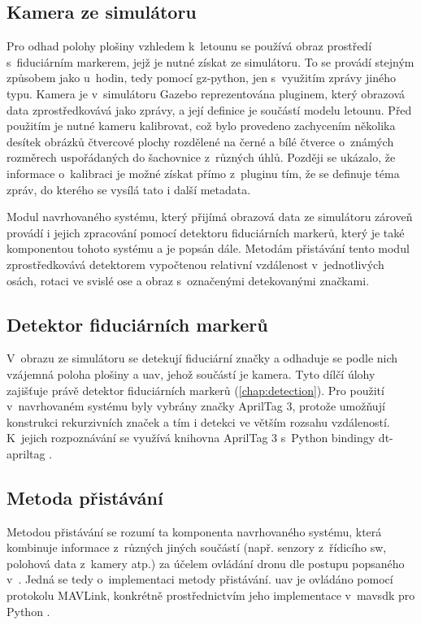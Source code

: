     \subsection{Kamera ze simulátoru}
      Pro odhad polohy plošiny vzhledem k~letounu se používá obraz prostředí s~fiduciárním markerem, jejž je nutné získat ze simulátoru. To se provádí stejným způsobem jako u~hodin, tedy pomocí gz-python, jen s~využitím zprávy jiného typu. Kamera je v~simulátoru Gazebo reprezentována pluginem, který obrazová data zprostředkovává jako zprávy, a její definice je součástí modelu letounu. Před použitím je nutné kameru kalibrovat, což bylo provedeno zachycením několika desítek obrázků čtvercové plochy rozdělené na černé a bílé čtverce o~známých rozměrech uspořádaných do šachovnice z~různých úhlů. Později se ukázalo, že informace o~kalibraci je možné získat přímo z~pluginu tím, že se definuje téma zpráv, do kterého se vysílá tato i další metadata.

      Modul navrhovaného systému, který přijímá obrazová data ze simulátoru zároveň provádí i jejich zpracování pomocí detektoru fiduciárních markerů, který je také komponentou tohoto systému a je popsán dále. Metodám přistávání tento modul zprostředkovává detektorem vypočtenou relativní vzdálenost v~jednotlivých osách, rotaci ve svislé ose a obraz s~označenými detekovanými značkami.
    \subsection{Detektor fiduciárních markerů}
      V~obrazu ze simulátoru se detekují fiduciární značky a odhaduje se podle nich vzájemná poloha plošiny a \acrshort{uav}, jehož součástí je kamera. Tyto dílčí úlohy zajišťuje právě detektor fiduciárních markerů (\cref{chap:detection}). Pro použití v~navrhovaném systému byly vybrány značky AprilTag 3, protože umožňují konstrukci rekurzivních značek a tím i detekci ve větším rozsahu vzdáleností. K~jejich rozpoznávání se využívá knihovna AprilTag 3 \cite{apriltag3} s~Python bindingy dt-apriltag \cite{dt-apriltags}.
    \subsection{Metoda přistávání}
      Metodou přistávání se rozumí ta komponenta navrhovaného systému, která kombinuje informace z~různých jiných součástí (např. senzory z~řídicího \acrshort{sw}, polohová data z~kamery atp.) za účelem ovládání dronu dle postupu popsaného v~. Jedná se tedy o~implementaci metody přistávání. \Acrshort{uav} je ovládáno pomocí protokolu MAVLink, konkrétně prostřednictvím jeho implementace v~mavsdk pro Python \cite{mavsdk}.
